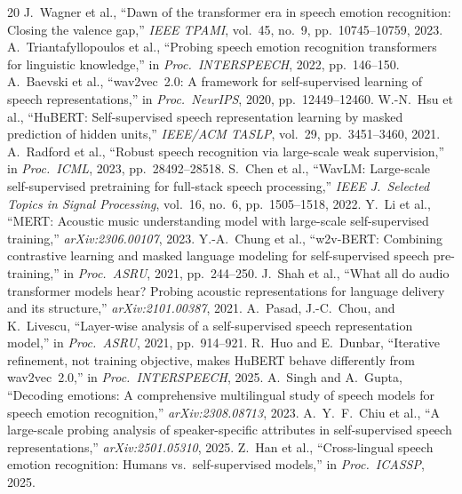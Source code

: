 \documentclass[sigconf,screen]{acmart}
\begin{document}

\begin{thebibliography}{20}
J.~Wagner et al., ``Dawn of the transformer era in speech emotion recognition: Closing the valence gap,'' \textit{IEEE TPAMI}, vol.~45, no.~9, pp.~10745--10759, 2023.
A.~Triantafyllopoulos et al., ``Probing speech emotion recognition transformers for linguistic knowledge,'' in \textit{Proc.\ INTERSPEECH}, 2022, pp.~146--150.
A.~Baevski et al., ``wav2vec~2.0: A framework for self-supervised learning of speech representations,'' in \textit{Proc.\ NeurIPS}, 2020, pp.~12449--12460.
W.-N.~Hsu et al., ``HuBERT: Self-supervised speech representation learning by masked prediction of hidden units,'' \textit{IEEE/ACM TASLP}, vol.~29, pp.~3451--3460, 2021.
A.~Radford et al., ``Robust speech recognition via large-scale weak supervision,'' in \textit{Proc.\ ICML}, 2023, pp.~28492--28518.
S.~Chen et al., ``WavLM: Large-scale self-supervised pretraining for full-stack speech processing,'' \textit{IEEE J.\ Selected Topics in Signal Processing}, vol.~16, no.~6, pp.~1505--1518, 2022.
Y.~Li et al., ``MERT: Acoustic music understanding model with large-scale self-supervised training,'' \textit{arXiv:2306.00107}, 2023.
Y.-A.~Chung et al., ``w2v-BERT: Combining contrastive learning and masked language modeling for self-supervised speech pre-training,'' in \textit{Proc.\ ASRU}, 2021, pp.~244--250.
J.~Shah et al., ``What all do audio transformer models hear? Probing acoustic representations for language delivery and its structure,'' \textit{arXiv:2101.00387}, 2021.
A.~Pasad, J.-C.~Chou, and K.~Livescu, ``Layer-wise analysis of a self-supervised speech representation model,'' in \textit{Proc.\ ASRU}, 2021, pp.~914--921.
R.~Huo and E.~Dunbar, ``Iterative refinement, not training objective, makes HuBERT behave differently from wav2vec~2.0,'' in \textit{Proc.\ INTERSPEECH}, 2025.
A.~Singh and A.~Gupta, ``Decoding emotions: A comprehensive multilingual study of speech models for speech emotion recognition,'' \textit{arXiv:2308.08713}, 2023.
A.~Y.~F.~Chiu et al., ``A large-scale probing analysis of speaker-specific attributes in self-supervised speech representations,'' \textit{arXiv:2501.05310}, 2025.
Z.~Han et al., ``Cross-lingual speech emotion recognition: Humans vs.\ self-supervised models,'' in \textit{Proc.\ ICASSP}, 2025.

\end{thebibliography}
\end{document}
